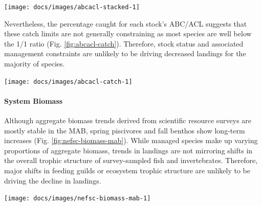 \documentclass[
  10pt,
]{article}
\let\origfigure\figure
\let\endorigfigure\endfigure
\renewenvironment{figure}[1][2] {
    \expandafter\origfigure\expandafter[H]
} {
    \endorigfigure
}
\begin{document}
\begin{figure}

{\centering \texttt{[image: docs/images/abcacl-stacked-1]} 

}

\caption{Sum of catch limits across all MAFMC managed fisheries.}\label{fig:abcacl-stacked}
\end{figure}

Nevertheless, the percentage caught for each stock's ABC/ACL suggests
that these catch limits are not generally constraining as most species
are well below the 1/1 ratio (Fig. \ref{fig:abcacl-catch}). Therefore,
stock status and associated management constraints are unlikely to be
driving decreased landings for the majority of species.

\begin{figure}

{\centering \texttt{[image: docs/images/abcacl-catch-1]} 

}

\caption{Catch divided by ABC/ACL for MAFMC managed fisheies. Chub mackerel removed due extremely low catch. Outliers = Recreational Black Sea Bass.}\label{fig:abcacl-catch}
\end{figure}

\hypertarget{system-biomass}{%
\paragraph{System Biomass}\label{system-biomass}}

Although aggregate biomass trends derived from scientific resource
surveys are mostly stable in the MAB, spring piscivores and fall benthos
show long-term increases (Fig. \ref{fig:nefsc-biomass-mab}). While
managed species make up varying proportions of aggregate biomass, trends
in landings are not mirroring shifts in the overall trophic structure of
survey-sampled fish and invertebrates. Therefore, major shifts in
feeding guilds or ecosystem trophic structure are unlikely to be driving
the decline in landings.

\begin{figure}

{\centering \texttt{[image: docs/images/nefsc-biomass-mab-1]} 

}

\caption{Spring (left) and fall (right) surveyed biomass in the Mid-Atlantic Bight. Data from the NEFSC Bottom Trawl Survey are shown in black, with the nearshore NEAMAP survey shown in red. The shaded area around each annual mean represents 2 standard deviations from the mean.}\label{fig:nefsc-biomass-mab}
\end{figure}
\end{document}
